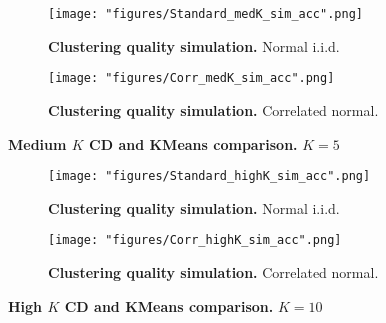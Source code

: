 \clearpage

\begin{figure}
\begin{subfigure}[b]{0.49\linewidth}
\texttt{[image: "figures/Standard\_medK\_sim\_acc".png]}
\caption{\textbf{Clustering quality simulation.} Normal i.i.d.}
\end{subfigure}
\hfill
\begin{subfigure}[b]{0.49\linewidth}
\texttt{[image: "figures/Corr\_medK\_sim\_acc".png]}
\caption{\textbf{Clustering quality simulation.} Correlated normal.}
\end{subfigure}
\caption{\textbf{Medium $K$ \acrshort{CD} and KMeans comparison.} $K=5$}
\label{fig:medK_sim}
\end{figure}

\begin{figure}
\begin{subfigure}[b]{0.49\linewidth}
\texttt{[image: "figures/Standard\_highK\_sim\_acc".png]}
\caption{\textbf{Clustering quality simulation.} Normal i.i.d.}
\end{subfigure}
\hfill
\begin{subfigure}[b]{0.49\linewidth}
\texttt{[image: "figures/Corr\_highK\_sim\_acc".png]}
\caption{\textbf{Clustering quality simulation.} Correlated normal.}
\end{subfigure}
\caption{\textbf{High $K$ \acrshort{CD} and KMeans comparison.} $K=10$}
\label{fig:highK_sim}
\end{figure}

\clearpage